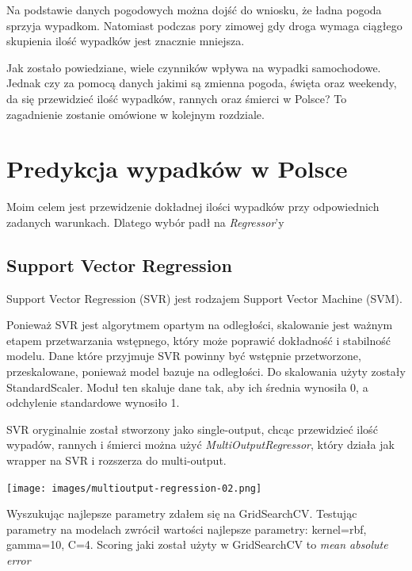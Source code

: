 \documentclass{article}
\begin{document}
Na podstawie danych pogodowych można dojść do wniosku, że ładna pogoda sprzyja wypadkom. Natomiast podczas pory zimowej gdy droga wymaga ciągłego skupienia ilość wypadków jest znacznie mniejsza.

Jak zostało powiedziane, wiele czynników wpływa na wypadki samochodowe. Jednak czy za pomocą danych jakimi są zmienna pogoda, święta oraz weekendy, da się przewidzieć ilość wypadków, rannych oraz śmierci w Polsce?
To zagadnienie zostanie omówione w kolejnym rozdziale.

\section{Predykcja wypadków w Polsce}

Moim celem jest przewidzenie dokładnej ilości wypadków przy odpowiednich zadanych warunkach. Dlatego wybór padł na \textit{Regressor}'y

\subsection{Support Vector Regression}
Support Vector Regression (SVR) jest rodzajem Support Vector Machine (SVM). 

Ponieważ SVR jest algorytmem opartym na odległości, skalowanie jest ważnym etapem przetwarzania wstępnego, który może poprawić dokładność i stabilność modelu.
Dane które przyjmuje SVR powinny być wstępnie przetworzone, przeskalowane, ponieważ model bazuje na odległości. Do skalowania użyty zostały StandardScaler. Moduł ten  skaluje dane tak, aby ich średnia wynosiła 0, a odchylenie standardowe wynosiło 1.


SVR oryginalnie został stworzony jako single-output, chcąc przewidzieć ilość wypadów, rannych i śmierci można użyć \textit{MultiOutputRegressor}, który działa jak wrapper na SVR i rozszerza do multi-output. 

 \begin{center}
    \texttt{[image: images/multioutput-regression-02.png]}
    \captionsetup{hypcap=false}
    \label{fig:multioutput}
\end{center}

Wyszukując najlepsze parametry zdałem się na GridSearchCV. Testując parametry na modelach zwrócił wartości najlepsze parametry: kernel=rbf, gamma=10, C=4.
Scoring jaki został użyty w GridSearchCV to \textit{mean absolute error}
\end{document}

